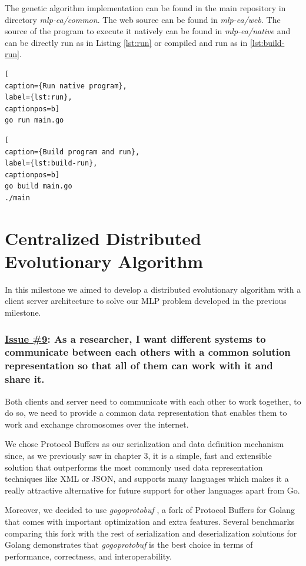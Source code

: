 The genetic algorithm implementation can be found in the main repository in directory \textit{mlp-ea/common}. The web source can be found in \textit{mlp-ea/web}. The source of the program to execute it natively can be found in \textit{mlp-ea/native} and can be directly run as in Listing \ref{lst:run} or compiled and run as in \ref{lst:build-run}.

\begin{lstlisting}[
caption={Run native program},
label={lst:run},
captionpos=b]
go run main.go
\end{lstlisting} 

\begin{lstlisting}[
caption={Build program and run},
label={lst:build-run},
captionpos=b]
go build main.go
./main
\end{lstlisting} 


\section{Centralized Distributed Evolutionary Algorithm}

In this milestone we aimed to develop a distributed evolutionary algorithm with a client server architecture to solve our MLP problem developed in the previous milestone.

\subsubsection*{\href{https://github.com/salvacorts/TFG-Parasitic-Metaheuristics/issues/9}{Issue \#9}: As a researcher, I want different systems to communicate between each others with a common solution representation so that all of them can work with it and share it.}

Both clients and server need to communicate with each other to work together, to do so, we need to provide a common data representation that enables them to work and exchange chromosomes over the internet. 

We chose Protocol Buffers as our serialization and data definition mechanism since, as we previously saw in chapter 3, it is a simple, fast and extensible solution that outperforms the most commonly used data representation techniques like XML or JSON, and supports many languages which makes it a really attractive alternative for future support for other languages apart from Go.

Moreover, we decided to use \textit{gogoprotobuf} \cite{gogo}, a fork of Protocol Buffers for Golang that comes with important optimization and extra features. Several benchmarks \cite{gogo-bench} comparing this fork with the rest of serialization and deserialization solutions for Golang demonstrates that \textit{gogoprotobuf} is the best choice in terms of performance, correctness, and interoperability.

